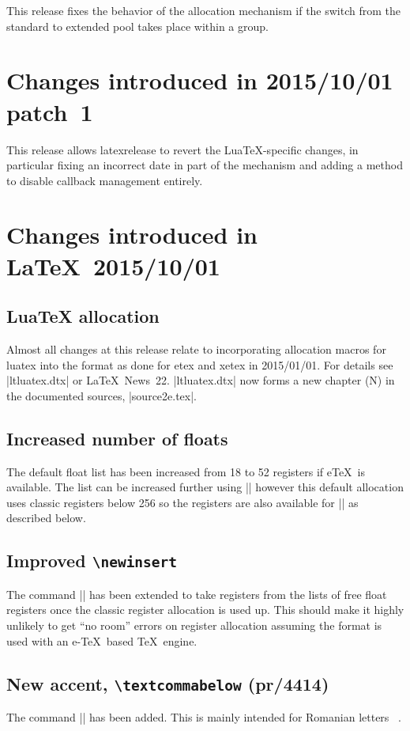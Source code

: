 \documentclass{ltxguide}
\newcommand\Lpack[1]{\mbox{\textsf{#1}}}
\newcommand\ltnewsissue[1]{\LaTeX\ News~#1}
\newcommand\ltnewsissue[1]{%
    \href{https://www.latex-project.org/news/latex2e-news/ltnews#1.pdf}{\LaTeX\ News~#1}}
\begin{document}
This release fixes the behavior of the allocation mechanism if the switch
from the standard to extended pool takes place within a group.

\section{Changes  introduced in 2015/10/01 patch~1}
This release allows \Lpack{latexrelease} to revert the
Lua\TeX{}-specific
changes, in particular fixing an incorrect date in part of the mechanism and
adding a method to disable callback management entirely.

\section{Changes  introduced in \LaTeX\ 2015/10/01}

\subsection{LuaTeX allocation}
Almost all changes at this release relate to incorporating allocation macros for luatex into the format
as done for etex and xetex in 2015/01/01. For details see |ltluatex.dtx| or \ltnewsissue{22}.
|ltluatex.dtx| now forms a new chapter (N) in the documented sources, |source2e.tex|.


\subsection{Increased number of floats}
The default float list has been increased from 18 to 52 registers if
e\TeX\ is available.
The list can be increased further using |\extrafloats| however this
default allocation uses classic registers below 256 so the registers are
also available for |\newinsert| as described below.

\subsection{Improved \texttt{\textbackslash newinsert}}
The command |\newinsert| has been extended to take registers from the lists of free float
registers once the classic register allocation is used up. This should make it highly unlikely
to get ``no room'' errors on register allocation assuming the format is used with
an e-\TeX\ based \TeX\ engine.

\subsection{New accent, \texttt{\textbackslash textcommabelow} (pr/4414)}
The command |\textcommabelow| has been added. This is mainly intended for Romanian letters
\,\,\,.
\end{document}

